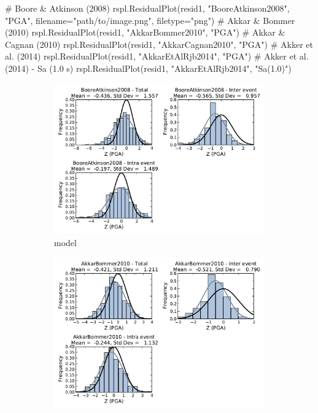 \begin{python}
# Boore & Atkinson (2008)
rspl.ResidualPlot(resid1, "BooreAtkinson2008", "PGA",
                  filename="path/to/image.png",
                  filetype="png")
# Akkar & Bommer (2010)
rspl.ResidualPlot(resid1, "AkkarBommer2010", "PGA")
# Akkar & Cagnan (2010)
rspl.ResidualPlot(resid1, "AkkarCagnan2010", "PGA")
# Akker et al. (2014)
rspl.ResidualPlot(resid1, "AkkarEtAlRjb2014", "PGA")
# Akker et al. (2014) - Sa (1.0 s)
rspl.ResidualPlot(resid1, "AkkarEtAlRjb2014", "Sa(1.0)")
\end{python}

\begin{figure}[htb]
  \centering
  \begin{subfigure}[b]{0.49\textwidth}
      \includegraphics[width=\textwidth]{./figures/residuals/BA2008_Residuals_PGA.pdf}
      \caption{\cite{boore2008} model}
      \label{fig:pga_res_ba2008}
  \end{subfigure}
    \begin{subfigure}[b]{0.49\textwidth}
      \includegraphics[width=\textwidth]{./figures/residuals/AB2010_Residuals_PGA.pdf}

\end{subfigure}
\end{figure}
